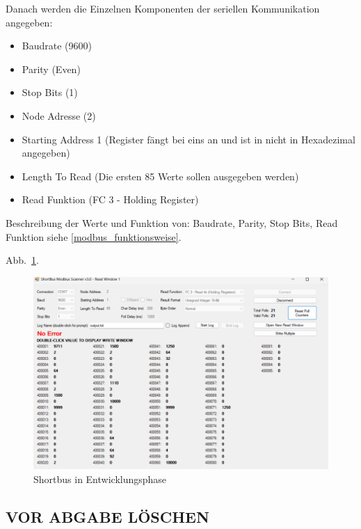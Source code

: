  Danach werden die Einzelnen Komponenten der seriellen Kommunikation angegeben:
\begin{itemize}
	\item Baudrate (9600)
	\item Parity (Even)
	\item Stop Bits (1)
	\item Node Adresse (2)
	\item Starting Address 1 (Register fängt bei eins an und ist in nicht in Hexadezimal angegeben)
	\item Length To Read (Die ersten 85 Werte sollen ausgegeben werden)
	\item Read Funktion (FC 3 - Holding Register)
\end{itemize}

Beschreibung der Werte und Funktion von: Baudrate, Parity, Stop Bits, Read Funktion siehe \ref{modbus_funktionsweise}.



Abb.~\ref{fig:Shortbusausgabe}. 

\begin{figure}[H]
	\centering
	\includegraphics[width=1\linewidth]{Bilder/shortbus_ausgabe}
	\caption{Shortbus in Entwicklungsphase} 
	\label{fig:Shortbusausgabe}
\end{figure}


\subsection{VOR ABGABE LÖSCHEN}


